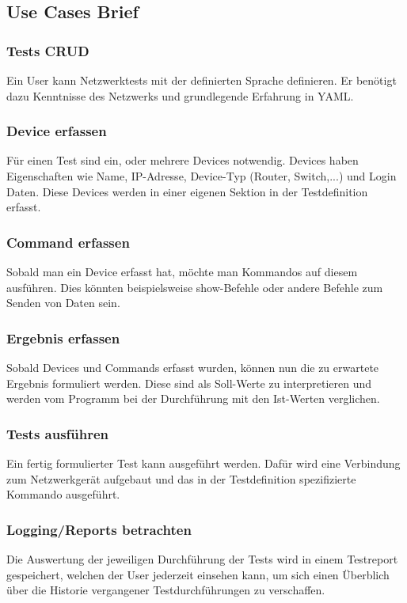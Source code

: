 \documentclass[
	ngerman,
	toc=listof, %
	toc=bibliography, %
	footnotes=multiple, %
	parskip=half, %
	numbers=noendperiod %
]{scrartcl}
\begin{document}
	\subsection{Use Cases Brief}
		\subsubsection{Tests CRUD}
			Ein User kann Netzwerktests mit der definierten Sprache definieren. Er benötigt dazu Kenntnisse des Netzwerks und grundlegende Erfahrung in YAML.

		\subsubsection{Device erfassen}
			Für einen Test sind ein, oder mehrere Devices notwendig. Devices haben Eigenschaften wie Name, IP-Adresse, Device-Typ (Router, Switch,...) und Login Daten.
			Diese Devices werden in einer eigenen Sektion in der Testdefinition erfasst.

		\subsubsection{Command erfassen}
			Sobald man ein Device erfasst hat, möchte man Kommandos auf diesem ausführen.
			Dies könnten beispielsweise show-Befehle oder andere Befehle zum Senden von Daten sein. 

		\subsubsection{Ergebnis erfassen}
			Sobald Devices und Commands erfasst wurden, können nun die zu erwartete Ergebnis formuliert werden. Diese sind als Soll-Werte zu interpretieren und werden vom Programm bei der Durchführung mit den Ist-Werten verglichen.

		\subsubsection{Tests ausführen}
			Ein fertig formulierter Test kann ausgeführt werden.
			Dafür wird eine Verbindung zum Netzwerkgerät aufgebaut und das in der Testdefinition spezifizierte Kommando ausgeführt.

		\subsubsection{Logging/Reports betrachten}
			Die Auswertung der jeweiligen Durchführung der Tests wird in einem Testreport gespeichert, welchen der User jederzeit einsehen kann, um sich einen Überblich über die Historie vergangener Testdurchführungen zu verschaffen.
\end{document}
